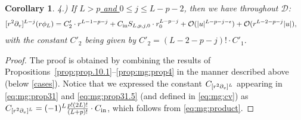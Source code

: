 \documentclass[11pt,english]{article}
\numberwithin{equation}{section}
\newtheorem{cor}{Corollary}[section]
\theoremstyle{remark}
\theoremstyle{plain}
\newenvironment{nalign}{
    \begin{equation}
    \begin{aligned}
}{
    \end{aligned}
    \end{equation}
    \ignorespacesafterend
}
\theoremstyle{remark}
\newcommand{\pv}{\partial_v}
\renewcommand{\(}{\left(}
\renewcommand{\)}{\right)}
\begin{document}
\begin{cor}
4.) If \underline{$L>p$ and $0\leq j\leq L-p-2$}, then we have throughout $\mathcal D$:
 \begin{nalign}
[r^2\pv]^{L-j}(r\phi_L)=C'_2  \cdot r^{L-1-p-j}+\ci  S_{L,p,j,0} \cdot r_0^{L-p-j} +\mathcal O(|u|^{L-p-j-\epsilon})+\mathcal O(r^{L-2-p-j}|u|), &&
\end{nalign}
with the constant $C'_2$ being given by
$C'_2=(L-2-p-j)!\cdot C'_1$.
\end{cor}

\begin{proof}
The proof is obtained by combining the results of Propositions~\ref{prop:prop.10.1}--\ref{prop:mg:prop4} in the manner described above (below \eqref{cases}). Notice that we expressed the constant $\cv{L}$ appearing in \eqref{eq:mg:prop31} and \eqref{eq:mg:prop31.5} (and defined in \eqref{eq:mg:cv}) as
$\cv{L}=(-1)^L \frac{p!(2L)!}{(L+p)!}\cdot C_{\mathrm{in}}$, which follows from \eqref{eq:mg:product}.
\end{proof}
\end{document}
